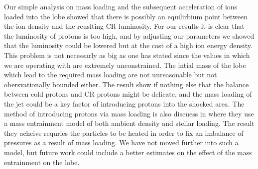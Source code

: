 Our simple analysis on mass loading and the subsequent acceleration of ions loaded into the lobe showed that there is possibly an equilirbium point between the ion density and the reuslting CR luminosity. For our results it is clear that the luminosity of protons is too high, and by adjusting our parameters we showed that the luminosity could be lowered but at the cost of a high ion energy density. This problem is not necessarly as big as one has stated since the values in which we are operating with are extremely unconstrained. The intial mass of the lobe which lead to the required mass loading are not unreasonable but not obersvationally bounded either. The result show if nothing else that the balance between cold protons and CR protons might be delicate, and the mass loading of the jet could be a key factor of introducing protons into the shocked area. The method of introducing protons via mass loading is also discuess in \cite{Wykes_2013} where they use a mass entrainment model of both ambient density and stellar loading. The result they acheive requries the particles to be heated in order to fix an imbalance of pressures as a result of mass loading. We have not moved further into such a model, but future work could include a better estimates on the effect of the mass entrainment on the lobe. 














 






